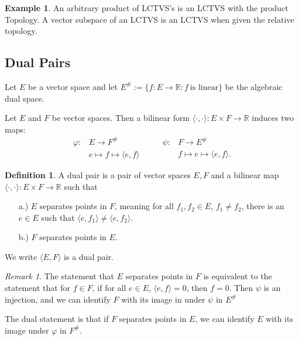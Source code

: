 \documentclass[12pt, reqno]{article}
\theoremstyle{plain}
\theoremstyle{definition}
\newtheorem*{definition}{Definition}
\newtheorem*{example}{Example}
\theoremstyle{remark}
\newtheorem*{remark}{Remark}
\newcommand{\RR}{\mathbb{R}}
\begin{document}
\begin{example}
    An arbitrary product of LCTVS's is an LCTVS with the product Topology. A vector subspace of an LCTVS is 
    an LCTVS when given the relative topology.
\end{example}

\subsection*{Dual Pairs}

Let $E$ be a vector space and let $E^{\#} := \{f: E \rightarrow \RR: f\ \textrm{is linear}\}$ be the algebraic dual space.

Let $E$ and $F$ be vector spaces. Then a bilinear form $\langle \cdot, \cdot \rangle: E \times F \rightarrow \RR$ induces 
two maps:
\begin{equation*}
    \begin{split}
        \varphi: &E \rightarrow F^\#\\
            &e \mapsto f \mapsto \langle e, f\rangle
    \end{split} \qquad 
    \begin{split}
        \psi: & F \rightarrow E^\#\\
            & f \mapsto e \mapsto \langle e,f \rangle.
    \end{split}
\end{equation*}

\begin{definition}
    A dual pair is a pair of vector spaces $E, F$ and a bilinear map $\langle \cdot, \cdot \rangle: E \times F \rightarrow \RR$
    such that 
    \begin{enumerate}
        \item[a.)] $E$ separates points in $F$, meaning for all $f_1, f_2 \in E$, $f_1 \neq f_2$, there is an $e \in E$
        such that $\langle e, f_1\rangle \neq \langle e, f_2\rangle$.
        \item[b.)] $F$ separates points in $E$.
    \end{enumerate}
    We write $\langle E, F\rangle$ is a dual pair. 
\end{definition}

\begin{remark}
    The statement that $E$ separates points in $F$ is equivalent to the statement that for $f \in F$, if for all $e \in E$, 
    $\langle e, f \rangle = 0$, then $f = 0$. Then $\psi$ is an injection, and we can identify $F$ with its image 
    in under $\psi$ in $E^\#$

    The dual statement is that if $F$ separates points in $E$, we can identify $E$ with its image under $\varphi$ in $F^\#$.
\end{remark}
\end{document}
